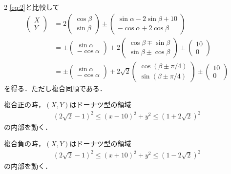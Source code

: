 \documentclass[../../main.tex]{subfiles}
\begin{document}
\begin{multicols}{2}
  \cref{eq:2}と比較して
  \begin{align}
    \begin{pmatrix} X \\ Y
    \end{pmatrix}
    & = 2
    \begin{pmatrix} \cos\beta \\ \sin\beta
    \end{pmatrix} \pm
    \begin{pmatrix} \sin\alpha - 2\sin\beta + 10 \\ -\cos\alpha + 2\cos\beta
    \end{pmatrix}                                             \\
    & = \pm
    \begin{pmatrix} \sin\alpha \\ -\cos\alpha
    \end{pmatrix} + 2
    \begin{pmatrix} \cos\beta \mp \sin\beta \\ \sin\beta \pm \cos\beta
    \end{pmatrix} \pm
    \begin{pmatrix} 10 \\ 0
    \end{pmatrix}     \\
    & = \pm
    \begin{pmatrix} \sin\alpha \\ -\cos\alpha
    \end{pmatrix} + 2\sqrt{2}
    \begin{pmatrix} \cos(\beta \pm \pi/4) \\ \sin(\beta \pm \pi/4)
    \end{pmatrix} \pm
    \begin{pmatrix} 10 \\ 0
    \end{pmatrix}
  \end{align}
  を得る．ただし複合同順である．

  複合正の時，$(X, Y)$はドーナツ型の領域
  \begin{align}
    (2\sqrt{2}-1)^2 \le (x-10)^2+y^2 \le (1+2\sqrt{2})^2
  \end{align}
  の内部を動く．

  複合負の時，$(X, Y)$はドーナツ型の領域
  \begin{align}
    (2\sqrt{2}-1)^2 \le (x+10)^2+y^2 \le (1-2\sqrt{2})^2
  \end{align}
  の内部を動く．


\end{multicols}
\end{document}
